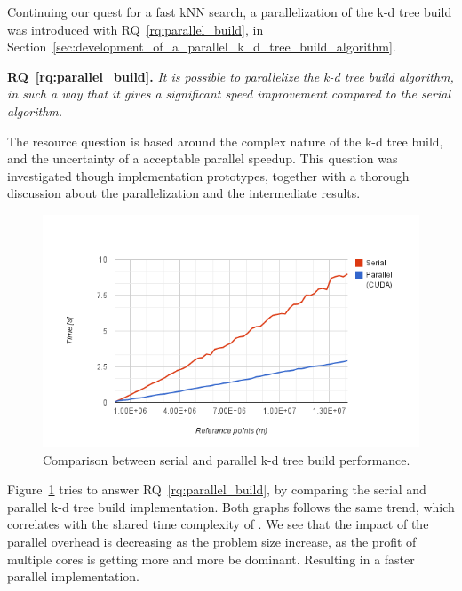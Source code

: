 
Continuing our quest for a fast kNN search, a parallelization of the k-d tree build was introduced with RQ~\ref{rq:parallel_build}, in Section~\ref{sec:development_of_a_parallel_k_d_tree_build_algorithm}.

\textbf{RQ~\ref{rq:parallel_build}.} \emph{It is possible to parallelize the k-d tree build algorithm, in such a way that it gives a significant speed improvement compared to the serial algorithm.}

The resource question is based around the complex nature of the k-d tree build, and the uncertainty of a acceptable parallel speedup. This question was investigated though implementation prototypes, together with a thorough discussion about the parallelization and the intermediate results. 



\begin{figure}[ht!]
    \centering
    \includegraphics[width=120mm]{../gfx/final_tree_build.png}
    \caption{Comparison between serial and parallel k-d tree build performance.}
    \label{fig:final_tree_build}
\end{figure}

Figure~\ref{fig:final_tree_build} tries to answer RQ~\ref{rq:parallel_build}, by comparing the serial and parallel k-d tree build implementation. Both graphs follows the same trend, which correlates with the shared time complexity of . We see that the impact of the parallel overhead is decreasing as the problem size increase, as the profit of multiple cores is getting more and more be dominant. Resulting in a faster parallel implementation.

